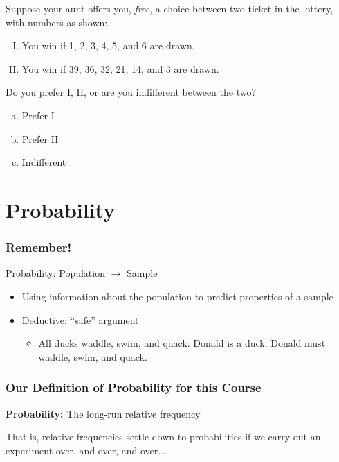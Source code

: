 \documentclass{beamer}
\begin{document}
\begin{singlespace}
\begin{frame}
	Suppose your aunt offers you, \emph{free}, a choice between two ticket in the lottery, with 
	numbers as shown:
	\begin{enumerate}[I.]
		\item You win if 1, 2, 3, 4, 5, and 6 are drawn.
		\item You win if 39, 36, 32, 21, 14, and 3 are drawn.
	\end{enumerate}
	\vspace{1em}
	Do you prefer I, II, or are you indifferent between the two?
	\begin{enumerate}[(a)]
		\item Prefer I
		\item Prefer II
		\item Indifferent
	\end{enumerate}
\end{frame}

\end{singlespace}

\section{Probability}
\begin{frame}
\frametitle{Remember!}
    Probability: Population $\rightarrow$ Sample
	\begin{itemize}
	    \item Using information about the population to predict properties of a sample
		\item Deductive: ``safe'' argument
		\begin{itemize}
        		\item All ducks waddle, swim, and quack. Donald is a duck. Donald must 								
		    waddle, swim, and quack.
		\end{itemize}
	\end{itemize}
\end{frame}

\begin{frame}
\frametitle{Our Definition of Probability for this Course}
    \textbf{Probability:} The long-run relative frequency

	\vspace{3em}
	\alert{That is, relative frequencies settle down to probabilities if we carry out an experiment over, and over, and over...}
\end{frame}
\end{document}
